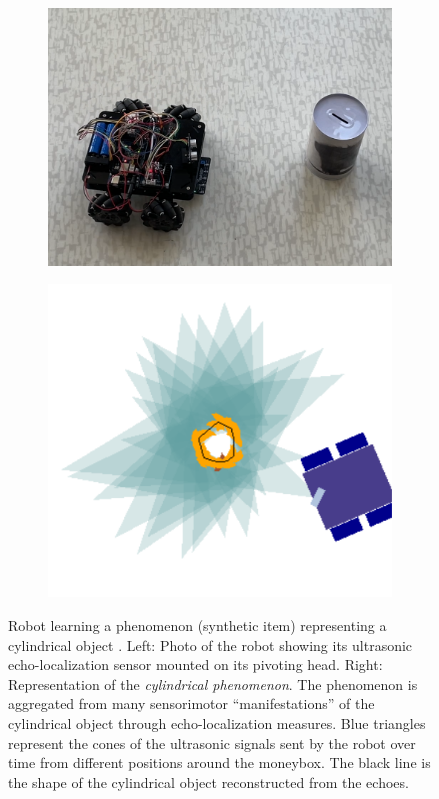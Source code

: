 \documentclass[runningheads]{llncs}
\begin{document}
\begin{figure}[htbp]
	\centering
	\begin{subfigure}{0.49\textwidth}
		\centering
		\includegraphics[width=\linewidth]{Figure_petitcat.png}
		\label{fig:first}
	\end{subfigure}
	\hfill
	\begin{subfigure}{0.49\textwidth}
		\centering
		\includegraphics[width=\linewidth]{Figure_phenomenon.png}
		\label{fig:second}
	\end{subfigure}
	\caption{Robot learning a phenomenon (synthetic item) representing a cylindrical object \cite[Fig. 5]{pmlr-v192-georgeon22a}.
		Left: Photo of the robot showing its ultrasonic echo-localization sensor mounted on its pivoting head. 
		Right: Representation of the \textit{cylindrical phenomenon}.
		The phenomenon is aggregated from many sensorimotor ``manifestations'' of the cylindrical object through echo-localization measures. 
		Blue triangles represent the cones of the ultrasonic signals sent by the robot over time from different positions around the moneybox.
		The black line is the shape of the cylindrical object reconstructed from the echoes. 
	}
	\label{fig:robot}
\end{figure}
\end{document}
